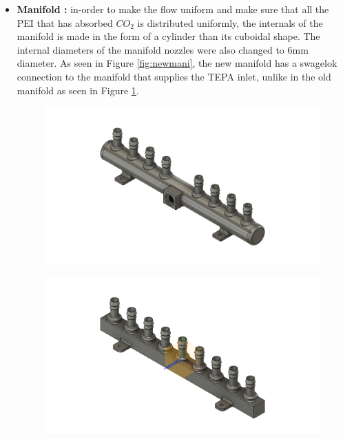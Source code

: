 \begin{itemize}
    \item \textbf{Manifold :} in-order to make the flow uniform and make sure that all the PEI that has absorbed $CO_2$ is distributed uniformly, the internals of the manifold is made in the form of a cylinder than its cuboidal shape. The internal diameters of the manifold nozzles were also changed to 6mm diameter. As seen in Figure \ref{fig:newmani}, the new manifold has a swagelok connection to the manifold that supplies the TEPA inlet, unlike in the old manifold as seen in Figure \ref{fig:oldmani}.
    
    
        \begin{figure}[H]
        \centering
        \begin{minipage}{.5\textwidth}
        \centering
        \includegraphics[width=\linewidth]{images/mywork/Sprint4/Manifold_main.png}
         \label{fig:newmani}
    \end{minipage}%
    \begin{minipage}{.5\textwidth}
        \centering
        \includegraphics[width=\linewidth]{images/mywork/Sprint4/Manifold_old.png}
        \label{fig:oldmani}
    \end{minipage}
    \end{figure}
    

\end{itemize}
